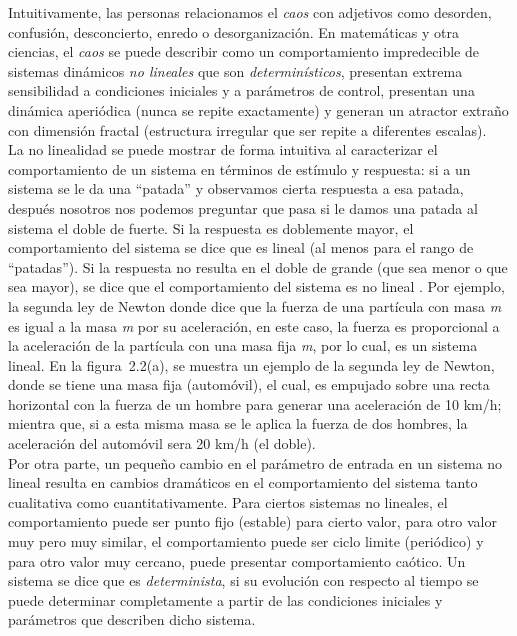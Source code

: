 Intuitivamente, las personas relacionamos el \textit{caos} con adjetivos como desorden, confusión, desconcierto, enredo o desorganización. En matemáticas y otra ciencias, el \textit{caos} se puede describir como un comportamiento impredecible de sistemas dinámicos \textit{no lineales} que son \textit{determinísticos}, presentan extrema sensibilidad a condiciones iniciales y a parámetros de control, presentan una dinámica aperiódica (nunca se repite exactamente) y generan un atractor extraño con dimensión fractal (estructura irregular que ser repite a diferentes escalas). \\

La no linealidad se puede mostrar de forma intuitiva al caracterizar el comportamiento de un sistema en términos de estímulo y respuesta: si a un sistema se le da una ``patada'' y observamos cierta respuesta a esa patada, después nosotros nos podemos preguntar que pasa si le damos una patada al sistema el doble de fuerte. Si la respuesta es doblemente mayor, el comportamiento del sistema se dice que es lineal (al menos para el rango de ``patadas''). Si la respuesta no resulta en el doble de grande (que sea menor o que sea mayor), se dice que el comportamiento del sistema es no lineal \cite{H_2005}. Por ejemplo, la segunda ley de Newton donde dice que la fuerza de una partícula con masa \textit{m} es igual a la masa \textit{m} por su aceleración, en este caso, la fuerza es proporcional a la aceleración de la partícula con una masa fija \textit{m}, por lo cual, es un sistema lineal. En la figura~2.2(a), se muestra un ejemplo de la segunda ley de Newton, donde se tiene una masa fija (automóvil), el cual, es empujado sobre una recta horizontal con la fuerza de un hombre para generar una aceleración de 10 km/h; mientra que, si a esta misma masa se le aplica la fuerza de dos hombres, la aceleración del automóvil sera 20 km/h (el doble).   \\

Por otra parte, un pequeño cambio en el parámetro de entrada en un sistema no lineal resulta en cambios dramáticos en el comportamiento del sistema tanto cualitativa como cuantitativamente. Para ciertos sistemas no lineales, el comportamiento puede ser punto fijo (estable) para cierto valor, para otro valor muy pero muy similar, el comportamiento puede ser ciclo limite (periódico) y para otro valor muy cercano, puede presentar comportamiento caótico. Un sistema se dice que es \textit{determinista}, si su evolución con respecto al tiempo se puede determinar completamente a partir de las condiciones iniciales y parámetros que describen dicho sistema.  \\


